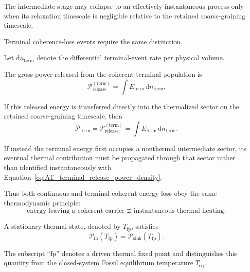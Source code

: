 The intermediate stage may collapse to an effectively instantaneous process
only when its relaxation timescale is negligible relative to the retained
coarse-graining timescale.

Terminal coherence-loss events require the same distinction.

Let
\(\mathrm d\dot n_{\mathrm{term}}\)
denote the differential terminal-event rate per physical volume.

The gross power released from the coherent terminal population is
\begin{equation}
    \mathcal P_{\mathrm{release}}^{(\mathrm{term})}
    =
    \int
    E_{\mathrm{term}}
    \,\mathrm d\dot n_{\mathrm{term}}.
    \label{eq:AT_terminal_release_power_density}
\end{equation}

If this released energy is transferred directly into the thermalized sector
on the retained coarse-graining timescale, then
\begin{equation}
    \mathcal P_{\mathrm{term}}
    =
    \mathcal P_{\mathrm{release}}^{(\mathrm{term})}
    =
    \int
    E_{\mathrm{term}}
    \,\mathrm d\dot n_{\mathrm{term}}.
    \label{eq:AT_terminal_power_density}
\end{equation}

If instead the terminal energy first occupies a nonthermal intermediate
sector, its eventual thermal contribution must be propagated through that
sector rather than identified instantaneously with
Equation~\eqref{eq:AT_terminal_release_power_density}.

Thus both continuous and terminal coherent-energy loss obey the same
thermodynamic principle:
\begin{equation}
    \text{energy leaving a coherent carrier}
    \not\equiv
    \text{instantaneous thermal heating}.
    \label{eq:AT_loss_not_instantaneous_heating}
\end{equation}

A stationary thermal state,
denoted by
\(T_{\mathrm{fp}}\),
satisfies
\begin{equation}
    \mathcal P_{\mathrm{in}}
    \left(
        T_{\mathrm{fp}}
    \right)
    =
    \mathcal P_{\mathrm{sink}}
    \left(
        T_{\mathrm{fp}}
    \right).
    \label{eq:AT_fixed_point}
\end{equation}

The subscript ``fp'' denotes a driven thermal fixed point and distinguishes
this quantity from the closed-system Fossil equilibrium temperature
\(T_{\mathrm{eq}}\).

